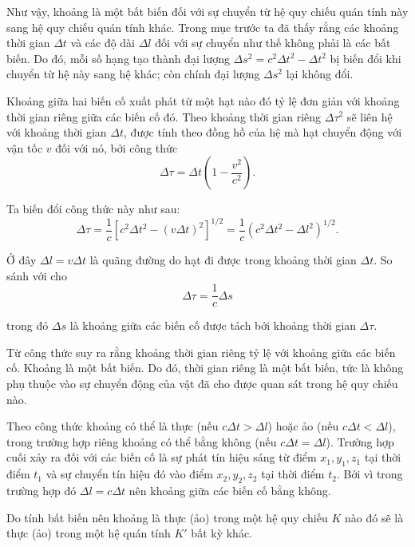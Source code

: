 Như vậy, khoảng là một bất biến đối với sự chuyển từ hệ quy chiếu quán tính này sang hệ quy chiếu quán tính khác. Trong mục trước ta đã thấy rằng các khoảng thời gian $\Delta t$ và các độ dài $\Delta l$ đối với sự chuyển như thế không phải là các bất biến. Do đó, mỗi số hạng tạo thành đại lượng $\Delta s^2=c^2\Delta t^2-\Delta t^2$ bị biến đổi khi chuyển từ hệ này sang hệ khác; còn chính đại lượng $\Delta s^2$ lại không đổi.

Khoảng giữa hai biến cố xuất phát từ một hạt nào đó tỷ lệ đơn giản với khoảng thời gian riêng giữa các biến cố đó. Theo  khoảng thời gian riêng $\Delta \tau^2$ sẽ liên hệ với khoảng thời gian $\Delta t$, được tính theo đồng hồ của hệ mà hạt chuyển động với vận tốc $v$ đối với nó, bởi công thức
\begin{equation*}
	\Delta\tau = \Delta t\left(1 - \frac{v^2}{c^2}\right).
\end{equation*}

\noindent
Ta biến đổi công thức này như sau:
\begin{equation*}
	\Delta\tau = \frac{1}{c}\left[c^2\Delta t^2 - (v\Delta t)^2\right]^{1/2} = \frac{1}{c}\left(c^2\Delta t^2 - \Delta l^2\right)^{1/2}.
\end{equation*}

\noindent
Ở đây $\Delta l=v\Delta t$ là quãng đường do hạt đi được trong khoảng thời gian $\Delta t$. So sánh với  cho
\begin{equation}\label{eq:8_25}
	\Delta\tau = \frac{1}{c}\Delta s
\end{equation}

\noindent
trong đó $\Delta s$ là khoảng giữa các biến cố được tách bởi khoảng thời gian $\Delta\tau$.

Từ công thức  suy ra rằng khoảng thời gian riêng tỷ lệ với khoảng giữa các biến cố. Khoảng là một bất biến. Do đó, thời gian riêng là một bất biến, tức là không phụ thuộc vào sự chuyển động của vật đã cho được quan sát trong hệ quy chiếu nào.

Theo công thức  khoảng có thể là thực (nếu $c\Delta t>\Delta l$) hoặc ảo (nếu $c\Delta t<\Delta l$), trong trường hợp riêng khoảng có thể bằng không (nếu $c\Delta t=\Delta l$). Trường hợp cuối xảy ra đối với các biến cố là sự phát tín hiệu sáng từ điểm $x_1, y_1, z_1$ tại thời điểm $t_1$ và sự chuyển tín hiệu đó vào điểm $x_2, y_2, z_2$ tại thời điểm $t_2$. Bởi vì trong trường hợp đó $\Delta l=c\Delta t$ nên khoảng giữa các biến cố bằng không.

Do tính bất biến nên khoảng là thực (ảo) trong một hệ quy chiếu $K$ nào đó sẽ là thực (ảo) trong một hệ quán tính $K'$ bất kỳ khác.

